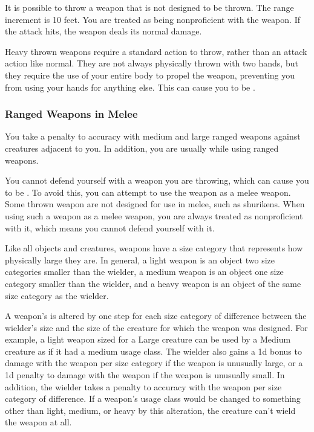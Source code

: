              It is possible to throw a weapon that is not designed to be thrown. The range increment is 10 feet. You are treated as being nonproficient with the weapon. If the attack hits, the weapon deals its normal damage.

             Heavy thrown weapons require a standard action to throw, rather than an attack action like normal.
            They are not always physically thrown with two hands, but they require the use of your entire body to propel the weapon, preventing you from using your hands for anything else.
            This can cause you to be .

        \subsubsection{Ranged Weapons in Melee}

            You take a  penalty to accuracy with medium and large ranged weapons against creatures adjacent to you. In addition, you are usually  while using ranged weapons.

            \label{Thrown Weapons in Melee} You cannot defend yourself with a weapon you are throwing, which can cause you to be . To avoid this, you can attempt to use the weapon as a melee weapon. Some thrown weapon are not designed for use in melee, such as shurikens. When using such a weapon as a melee weapon, you are always treated as nonproficient with it, which means you cannot defend yourself with it.

             Like all objects and creatures, weapons have a size category that represents how physically large they are. In general, a light weapon is an object two size categories smaller than the wielder, a medium weapon is an object one size category smaller than the wielder, and a heavy weapon is an object of the same size category as the wielder.

            \label{Inappropriately Sized Weapons} A weapon's  is altered by one step for each size category of difference between the wielder's size and the size of the creature for which the weapon was designed.
            For example, a light weapon sized for a Large creature can be used by a Medium creature as if it had a medium usage class.
            The wielder also gains a \plus1d bonus to damage with the weapon per size category if the weapon is unusually large, or a \minus1d penalty to damage with the weapon if the weapon is unusually small.
            In addition, the wielder takes a  penalty to accuracy with the weapon per size category of difference.
            If a weapon's usage class would be changed to something other than light, medium, or heavy by this alteration, the creature can't wield the weapon at all.

